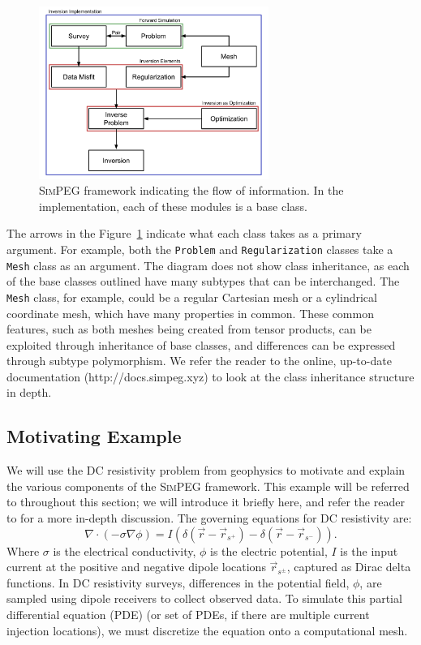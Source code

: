 \documentclass[preprint,review,3p,times,onecolumn,authoryear]{elsarticle}
\newcommand{\SimPEG}{\textsc{SimPEG}\xspace}
\newcommand{\Mesh}{\texttt{Mesh}\xspace}
\newcommand{\Problem}{\texttt{Problem}\xspace}
\newcommand{\Regularization}{\texttt{Regularization}\xspace}
\begin{document}
{%
\begin{figure}[ht!]
\centering
\includegraphics[width=7.5cm]{images/SimPEGFrameworkRevised.png}
\caption{\SimPEG framework indicating the flow of information. In the implementation, each of these modules is a base class.}
\label{fig:classOutline}
\end{figure}
}

The arrows in the Figure~\ref{fig:classOutline} indicate what each class
takes as a primary argument. For example, both the \Problem and \Regularization
classes take a \Mesh class as an argument. The diagram
does not show class inheritance, as each of the base classes outlined have
many subtypes that can be interchanged. The \Mesh class, for example, could
be a regular Cartesian mesh or a cylindrical coordinate mesh, which have
many properties in common. These common features, such as both meshes
being created from tensor products, can be exploited through inheritance
of base classes, and differences can be expressed through subtype
polymorphism. We refer the reader to the online, up-to-date documentation (http://docs.simpeg.xyz) to look at the class inheritance structure in depth.

\subsection{Motivating Example}
\label{sub:motivating_example}
We will use the DC resistivity problem from geophysics
to motivate and explain the various components of the \SimPEG framework. This example will be
referred to throughout this section; we will introduce it briefly here,
and refer the reader to \cite{Pidlisecky2007} %
for a more in-depth discussion.
The governing equations for DC resistivity are:
{%
\begin{equation}
\label{eq:dc}
\nabla \cdot ( - \sigma \nabla \phi) = I(\delta(\vec{r}-\vec{r}_{s^+}) - \delta(\vec{r}-\vec{r}_{s^-})).
\end{equation}
}
Where $\sigma$ is the electrical conductivity,
$\phi$ is the electric potential,
$I$ is the input current at the positive and negative dipole locations $\vec{r}_{s^\pm}$, captured as Dirac delta functions.
In DC resistivity surveys, differences in the potential field, $\phi$, are sampled using dipole receivers to collect observed data.
To simulate this partial differential equation (PDE) (or set of PDEs, if there are multiple current injection locations), we must discretize the equation onto a computational mesh.
\end{document}
